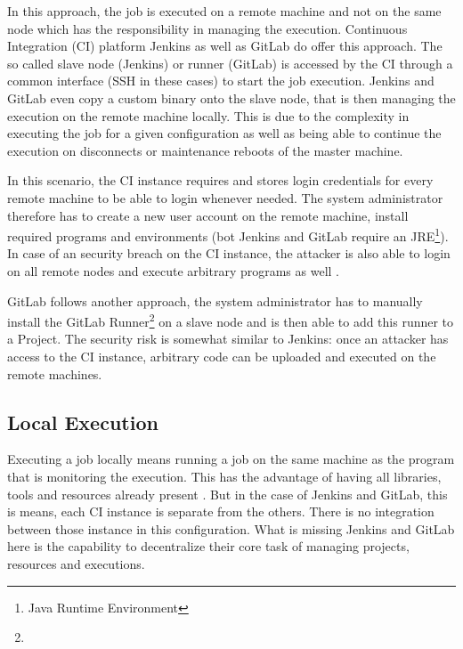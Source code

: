 In this approach, the job is executed on a remote machine and not on the same node which has the responsibility in managing the execution.
Continuous Integration (CI) platform Jenkins\cite{jenkins:main} as well as GitLab\cite{gitlab:main} do offer this approach.
The so called slave node (Jenkins) or runner (GitLab) is accessed by the CI through a common interface (SSH in these cases) to start the job execution.
Jenkins and GitLab even copy a custom binary onto the slave node, that is then managing the execution on the remote machine locally.
This is due to the complexity in executing the job for a given configuration as well as being able to continue the execution on disconnects or maintenance reboots of the master machine.

In this scenario, the CI instance requires and stores login credentials for every remote machine to be able to login whenever needed.
The system administrator therefore has to create a new user account on the remote machine, install required programs and environments (bot Jenkins and GitLab require an JRE\footnote{Java Runtime Environment}).
In case of an security breach on the CI instance, the attacker is also able to login on all remote nodes and execute arbitrary programs as well .


GitLab follows another approach, the system administrator has to manually install the GitLab Runner\footnote{} on a slave node and is then able to add this runner to a Project.
The security risk is somewhat similar to Jenkins: once an attacker has access to the CI instance, arbitrary code can be uploaded and executed on the remote machines. 


\subsection{Local Execution}

Executing a job locally means running a job on the same machine as the program that is monitoring the execution.
This has the advantage of having all libraries, tools and resources already present .
But in the case of Jenkins and GitLab, this is means, each CI instance is separate from the others.
There is no integration between those instance in this configuration.
What is missing Jenkins and GitLab here is the capability to decentralize their core task of managing projects, resources and executions.


